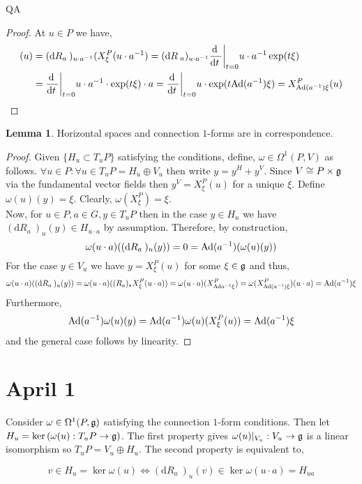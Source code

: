 QA	 \documentclass[12pt]{extarticle}
\renewcommand{\d}[1]{ \mathrm{d}#1 \:}
\newcommand{\deriv}[2]{\frac{\d{#1}}{\d{#2}}}
\theoremstyle{definition}
\newtheorem{lemma}[theorem]{Lemma}
\begin{document}
\begin{proof}
At $u \in P$ we have,
\begin{align*}
[(R_a)_* X^P_\xi](u) & = (\d{R_a})_{u \cdot a^{-1}}(X^P_\xi(u \cdot a^{-1}) = (\d{R}_a)_{u \cdot a^{-1}} \deriv{}{t} \bigg|_{t = 0} u \cdot a^{-1} \exp(t \xi)
\\
& = \deriv{}{t} \bigg|_{t = 0} u \cdot a^{-1} \cdot \exp(t \xi) \cdot a = \deriv{}{t} \bigg|_{t = 0} u \cdot \exp(t \Ad(a^{-1}) \xi) = X^P_{\Ad(a^{-1}) \xi}(u) 
\end{align*}
\end{proof}

\begin{lemma}
Horizontal spaces and connection $1$-forms are in correspondence.
\end{lemma}

\begin{proof}
Given $\{ H_u \subset T_u P \}$ satisfying the conditions, define, $\omega \in \Omega^1(P, V)$ as follows. $\forall u \in P : \forall u \in T_u P = H_u \oplus V_u$ then write $y = y^H + y^V$. Since $V \cong P \times \mathfrak{g}$ via the fundamental vector fields then $y^V = X_\xi^P(u)$ for a unique $\xi$. Define $\omega(u)(y) = \xi$. Clearly, $\omega(X^P_\xi) = \xi$.
\bigskip\\
Now, for $u \in P, a \in G, y \in T_u P$ then in the case $y \in H_u$ we have $(\d{R_a})_u(y) \in H_{u \cdot a}$ by assumption. Therefore, by construction,
\[ \omega(u \cdot a)((\d{R_a})_u(y)) = 0 = \Ad(a^{-1})(\omega(u)(y)) \]
For the case $y \in V_u$ we have $y = X^P_\xi(u)$ for some $\xi \in \mathfrak{g}$ and thus,
\[ \omega(u \cdot a)((\d{R_a})_u (y)) = \omega(u \cdot a)((R_a)_* X^P_\xi(u \cdot a)) = \omega(u \cdot a)(X^P_{\Ad{a^{-1}} \xi}) = \omega(X^P_{\Ad(a^{-1}) \xi})(u \cdot a) = \Ad(a^{-1}) \xi \]
Furthermore,
\[ \mathrm{Ad}(a^{-1}) \omega(u)(y) = \mathrm{Ad}(a^{-1}) \omega(u)(X^P_{\xi}(u)) = \mathrm{Ad}(a^{-1}) \xi \]
and the general case follows by linearity. 
\end{proof}

\section{April 1}

Consider $\omega \in \Omega^1(P, \mathfrak{g})$ satisfying the connection $1$-form conditions. Then let $H_u = \ker{(\omega(u) : T_u P \to \mathfrak{g})}$. The first property gives $\omega(u)|_{V_u} : V_u \to \mathfrak{g}$ is a linear isomorphism so $T_u P = V_u \oplus H_u$. The second property is equivalent to,
\begin{center}
\end{center}
\[ v \in H_u = \ker{\omega(u)} \iff (\d{R_a})_u(v) \in \ker{\omega(u \cdot a)} = H_{ua} \]
\end{document}
